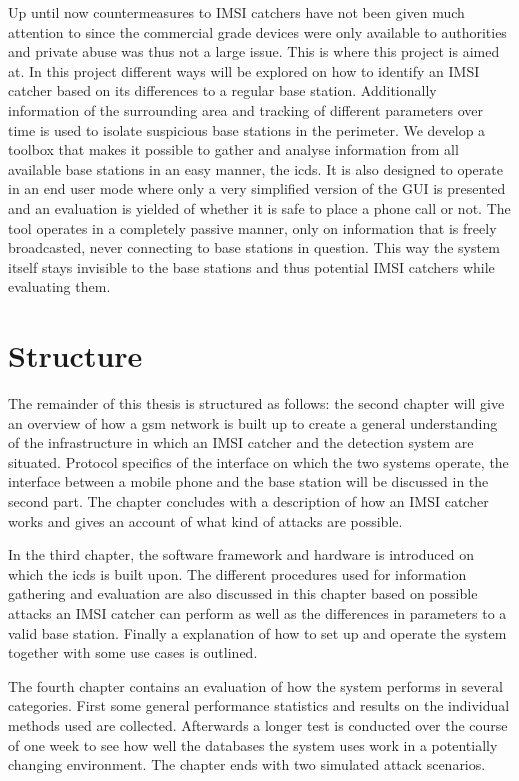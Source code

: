 Up until now countermeasures to IMSI catchers have not been given much attention to since the commercial grade devices were only available to authorities and private abuse was thus not a large issue.
This is where this project is aimed at.
In this project different ways will be explored on how to identify an IMSI catcher based on its differences to a regular base station.
Additionally information of the surrounding area and tracking of different parameters over time is used to isolate suspicious base stations in the perimeter.
We develop a toolbox that makes it possible to gather and analyse information from all available base stations in an easy manner, the \gls{icds}.
It is also designed to operate in an end user mode where only a very simplified version of the GUI is presented and an evaluation is yielded of whether it is safe to place a phone call or not.
The tool operates in a completely passive manner, only on information that is freely broadcasted, never connecting to base stations in question.
This way the system itself stays invisible to the base stations and thus potential IMSI catchers while evaluating them.

\section{Structure}
The remainder of this thesis is structured as follows: the second chapter will give an overview of how a \gls{gsm} network is built up to create a general understanding of the infrastructure in which an IMSI catcher and the detection system are situated.
Protocol specifics of the interface on which the two systems operate, the interface between a mobile phone and the base station will be discussed in the second part.
The chapter concludes with a description of how an IMSI catcher works and gives an account of what kind of attacks are possible.

In the third chapter, the software framework and hardware is introduced on which the \gls{icds} is built upon.
The different procedures used for information gathering and evaluation are also discussed in this chapter based on possible attacks an IMSI catcher can perform as well as the differences in parameters to a valid base station.
Finally a explanation of how to set up and operate the system together with some use cases is outlined.

The fourth chapter contains an evaluation of how the system performs in several categories.
First some general performance statistics and results on the individual methods used are collected.
Afterwards a longer test is conducted over the course of one week to see how well the databases the system uses work in a potentially changing environment.
The chapter ends with two simulated attack scenarios.

